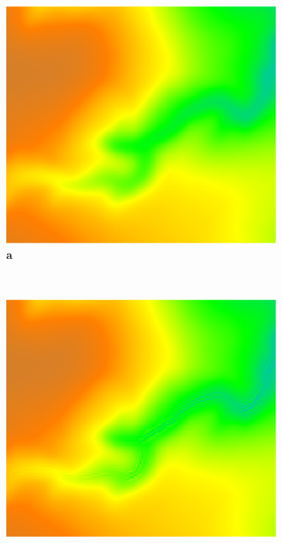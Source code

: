 \documentclass[10pt,letterpaper]{article}
\begin{document}
\begin{figure}
\centering
%   
\begin{subfigure}[b]{0.3\textwidth}
\includegraphics[width=\textwidth]{images/lrwoods_elevation.png}
\label{fig_2_1}
\textbf{a} \\
\end{subfigure}
%
~ %
%
\begin{subfigure}[b]{0.3\textwidth}
\includegraphics[width=\textwidth]{images/lrwoods_dynamics_erdep_5m_30m.png}

\end{subfigure}
\end{figure}
\end{document}
